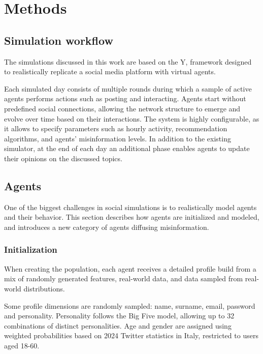 \section{Methods}
\label{sec:methods}

\subsection{Simulation workflow}
The simulations discussed in this work are based on the Y, framework designed to realistically replicate a social media platform with virtual agents. 

Each simulated day consists of multiple rounds during which a sample of active agents performs actions such as posting and interacting.
Agents start without predefined social connections, allowing the network structure to emerge and evolve over time based on their interactions. 
The system is highly configurable, as it allows to specify parameters such as hourly activity, recommendation algorithms, and agents’ misinformation levels.
In addition to the existing simulator, at the end of each day an additional phase enables agents to update their opinions on the discussed topics.



\subsection{Agents}

One of the biggest challenges in social simulations is to realistically model agents and their behavior. 
This section describes how agents are initialized and modeled, and introduces a new category of agents diffusing misinformation.

\subsubsection{Initialization}
When creating the population, each agent receives a detailed profile build from a mix of randomly generated features, real-world data, and data sampled from real-world distributions.

Some profile dimensions are randomly sampled: name, surname, email, password and personality.
Personality follows the Big Five model, allowing up to 32 combinations of distinct personalities.
Age and gender are assigned using weighted probabilities based on 2024 Twitter statistics in Italy, restricted to users aged 18-60.

